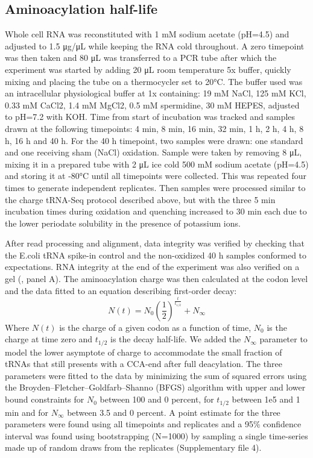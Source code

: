 \documentclass[9pt,lineno]{elife}
\begin{document}
\subsection{Aminoacylation half-life}
Whole cell RNA was reconstituted with 1 mM sodium acetate (pH=4.5) and adjusted to 1.5 μg/μL while keeping the RNA cold throughout.
A zero timepoint was then taken and 80 μL was transferred to a PCR tube after which the experiment was started by adding 20 μL room temperature 5x buffer, quickly mixing and placing the tube on a thermocycler set to 20°C.
The buffer used was an intracellular physiological buffer at 1x containing: 19 mM NaCl, 125 mM KCl, 0.33 mM CaCl2, 1.4 mM MgCl2, 0.5 mM spermidine, 30 mM HEPES, adjusted to pH=7.2 with KOH.
Time from start of incubation was tracked and samples drawn at the following timepoints: 4 min, 8 min, 16 min, 32 min, 1 h, 2 h, 4 h, 8 h, 16 h and 40 h.
For the 40 h timepoint, two samples were drawn: one standard and one receiving sham (NaCl) oxidation.
Sample were taken by removing 8 μL, mixing it in a prepared tube with 2 μL ice cold 500 mM sodium acetate (pH=4.5) and storing it at -80°C until all timepoints were collected.
This was repeated four times to generate independent replicates.
Then samples were processed similar to the charge tRNA-Seq protocol described above, but with the three 5 min incubation times during oxidation and quenching increased to 30 min each due to the lower periodate solubility in the presence of potassium ions.

After read processing and alignment, data integrity was verified by checking that the E.coli tRNA spike-in control and the non-oxidized 40 h samples conformed to expectations.
RNA integrity at the end of the experiment was also verified on a gel (, panel A).
The aminoacylation charge was then calculated at the codon level and the data fitted to an equation describing first-order decay:
\begin{equation}
N(t) = N_0 \left( \frac{1}{2} \right) ^\frac{t}{t_{1/2}} + N_{\infty}
\end{equation}
Where $N(t)$ is the charge of a given codon as a function of time, $N_0$ is the charge at time zero and $t_{1/2}$ is the decay half-life.
We added the $N_{\infty}$ parameter to model the lower asymptote of charge to accommodate the small fraction of tRNAs that still presents with a CCA-end after full deacylation.
The three parameters were fitted to the data by minimizing the sum of squared errors using the Broyden–Fletcher–Goldfarb–Shanno (BFGS) algorithm with upper and lower bound constraints for $N_0$ between 100 and 0 percent, for $t_{1/2}$ between 1e5 and 1 min and for $N_{\infty}$ between 3.5 and 0 percent.
A point estimate for the three parameters were found using all timepoints and replicates and a 95\% confidence interval was found using bootstrapping (N=1000) by sampling a single time-series made up of random draws from the replicates (Supplementary file 4).
\end{document}

